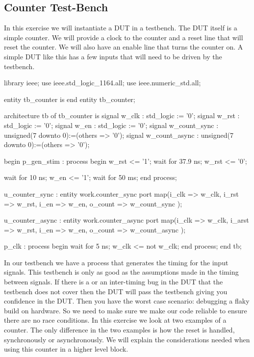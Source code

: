 	
\subsection{Counter Test-Bench}

In this exercise we will instantiate a \ac{DUT} in a testbench. The \ac{DUT} itself is a simple counter. We will provide a clock to the counter and a reset line that will reset the counter. We will also have an enable line that turns the counter on. A simple \ac{DUT} like this has a few inputs that will need to be driven by the testbench.      
	
\begin{VHDLlisting}
library ieee;
  use ieee.std_logic_1164.all;
  use ieee.numeric_std.all;
  
entity tb_counter is
end entity tb_counter;

architecture tb of tb_counter is
    signal w_clk         : std_logic := '0';
    signal w_rst         : std_logic := '0';
    signal w_en          : std_logic := '0';
    signal w_count_sync  : unsigned(7 downto 0):=(others => '0');
    signal w_count_async : unsigned(7 downto 0):=(others => '0');

begin
    p_gen_stim : process
    begin
        w_rst <= '1';
        wait for 37.9 ns;
        w_rst <= '0';
		
        wait for 10 ns;
        w_en <= '1';
        wait for 50 ms;	
    end process;
	
    u_counter_sync : entity work.counter_sync
    port map(i_clk    => w_clk,
             i_rst    => w_rst,
             i_en     => w_en,
             o_count  => w_count_sync
    );
	
    u_counter_async : entity work.counter_async
    port map(i_clk    => w_clk,
             i_arst   => w_rst,
             i_en     => w_en,
             o_count  => w_count_async
    );
	
    p_clk : process
    begin
        wait for 5 ns;
        w_clk <= not w_clk;
    end process;
end tb;
\end{VHDLlisting}

In our testbench we have a process that generates the timing for the input signals. This testbench is only as good as the assumptions made in the timing between signals. If there is a  or an inter-timing bug in the \ac{DUT} that the testbench does not cover then the \ac{DUT} will pass the testbench giving you confidence in the \ac{DUT}. Then you have the worst case scenario: debugging a flaky build on hardware. So we need to make sure we make our code reliable to ensure there are no race conditions. In this exercise we look at two examples of a counter. The only difference in the two examples is how the reset is handled, synchronously or asynchronously. We will explain the considerations needed when using this counter in a higher level block.      

